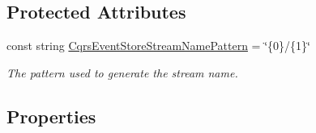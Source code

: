 \subsection*{Protected Attributes}
\begin{DoxyCompactItemize}
\item 
const string \hyperlink{classCqrs_1_1Events_1_1EventStore_a1e6d87995d38d6fbb148388ec165a87e_a1e6d87995d38d6fbb148388ec165a87e}{Cqrs\+Event\+Store\+Stream\+Name\+Pattern} = \char`\"{}\{0\}/\{1\}\char`\"{}
\begin{DoxyCompactList}\small\item\em The pattern used to generate the stream name. \end{DoxyCompactList}\end{DoxyCompactItemize}
\subsection*{Properties}
